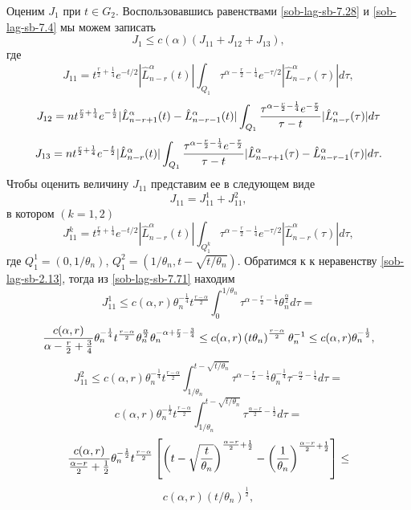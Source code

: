 Оценим $J_1$ при $t\in G_2$. Воспользовавшись равенствами \eqref{sob-lag-sb-7.28} и \eqref{sob-lag-sb-7.4} мы можем записать
\begin{equation}\label{sob-lag-sb-7.66}
J_1\le c(\alpha)(J_{11}+J_{12}+J_{13}),
\end{equation}
где
\begin{equation}\label{sob-lag-sb-7.67}
J_{11}=t^{\frac{r}{2}+\frac14}e^{-t/2}|\hat L_{n-r}^\alpha(t)|\int_{Q_1}\tau^{\alpha-\frac{r}{2}-\frac14}e^{-\tau/2}|\hat L_{n-r}^\alpha(\tau)|d\tau,
\end{equation}
\begin{equation}\label{sob-lag-sb-7.68}
J_{12}=nt^{\frac{r}{2}+\frac14}e^{-\frac{t}{2}}|\hat L_{n-r+1}^\alpha(t)-\hat L_{n-r-1}^\alpha(t)|\int_{Q_1}{\tau^{\alpha-\frac{r}{2}-\frac14}e^{-\frac{\tau}{2}}\over \tau-t}|\hat L_{n-r}^\alpha(\tau)|d\tau \end{equation}
\begin{equation}\label{sob-lag-sb-7.69}
J_{13}=nt^{\frac{r}{2}+\frac14}e^{-\frac{t}{2}}|\hat L_{n-r}^\alpha(t)|\int_{Q_1}{\tau^{\alpha-\frac{r}{2}-\frac14}e^{-\frac{\tau}{2}}\over \tau-t}|\hat L_{n-r+1}^\alpha(\tau)-\hat L_{n-r-1}^\alpha(\tau)|d\tau.
\end{equation}
Чтобы оценить величину $J_{11}$ представим ее в следующем виде
\begin{equation}\label{sob-lag-sb-7.70}
J_{11}=J_{11}^1+J_{11}^2,
\end{equation}
в котором $(k=1,2)$
\begin{equation}\label{sob-lag-sb-7.71}
J_{11}^k=t^{\frac{r}{2}+\frac14}e^{-t/2}|\hat L_{n-r}^\alpha(t)|\int_{Q_{1}^k}\tau^{\alpha-\frac{r}{2}-\frac14}e^{-\tau/2}|\hat L_{n-r}^\alpha(\tau)|d\tau,
\end{equation}
где $Q_{1}^1=(0,1/\theta_n)$, $Q_{1}^2=(1/\theta_n,t-\sqrt{t/\theta_n})$. Обратимся к к неравенству \eqref{sob-lag-sb-2.13}, тогда из  \eqref{sob-lag-sb-7.71} находим
$$
J_{11}^1\le c(\alpha,r)\theta_n^{-\frac14}t^\frac{r-\alpha}{2}\int_0^{1/\theta_n}\tau^{\alpha-\frac{r}{2}-\frac14}\theta_n^{\frac\alpha2}d\tau=
$$
\begin{equation}\label{sob-lag-sb-7.72}
{c(\alpha,r)\over \alpha-\frac{r}{2}+\frac34}\theta_n^{-\frac14}t^\frac{r-\alpha}{2}\theta_n^{\frac\alpha2}\theta_n^{-\alpha+\frac{r}{2}-\frac34}\le
c(\alpha,r)\left(t\theta_n\right)^\frac{r-\alpha}{2}\theta_n^{-1}\le c(\alpha,r)\theta_n^{-\frac12},
\end{equation}
$$
J_{11}^2\le c(\alpha,r)\theta_n^{-\frac14}t^\frac{r-\alpha}{2}\int_{1/\theta_n}^{t-\sqrt{t/\theta_n}}
\tau^{\alpha-\frac{r}{2}-\frac14}\theta_n^{-\frac14}\tau^{-\frac{\alpha}{2}-\frac14}d\tau=
$$
$$
c(\alpha,r)\theta_n^{-\frac12}t^\frac{r-\alpha}{2}\int_{1/\theta_n}^{t-\sqrt{t/\theta_n}}
\tau^{\frac{\alpha-r}{2}-\frac12}d\tau=
$$
$$
{c(\alpha,r)\over\frac{\alpha-r}{2}+\frac12}\theta_n^{-\frac12}t^\frac{r-\alpha}{2}
\left[
\left(t-\sqrt{\frac{t}{\theta_n}}\right)^{\frac{\alpha-r}{2}+\frac12}-\left(\frac{1}{\theta_n}\right)^{\frac{\alpha-r}{2}+\frac12}\right]\le
$$
\begin{equation}\label{sob-lag-sb-7.73}
c(\alpha,r)(t/\theta_n)^{\frac{1}{2}},
\end{equation}

